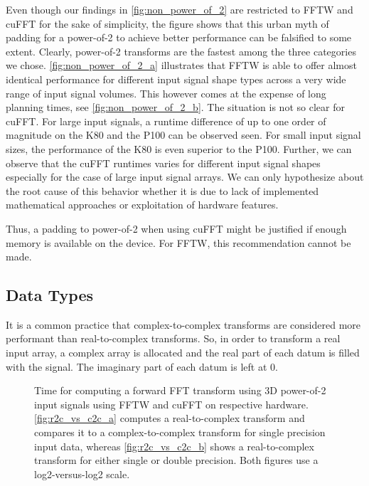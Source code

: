 Even though our findings in \cref{fig:non_power_of_2} are restricted to FFTW and cuFFT for the sake of simplicity, the figure shows that this urban myth of padding for a power-of-2 to achieve better performance can be falsified to some extent. Clearly, power-of-2 transforms are the fastest among the three categories we chose. \cref{fig:non_power_of_2_a} illustrates that FFTW is able to offer almost identical performance for different input signal shape types across a very wide range of input signal volumes. This however comes at the expense of long planning times, see \cref{fig:non_power_of_2_b}. The situation is not so clear for cuFFT. For large input signals, a runtime difference of up to one order of magnitude on the K80 and the P100 can be observed seen. For small input signal sizes, the performance of the K80 is even superior to the P100. Further, we can observe that the cuFFT runtimes varies for different input signal shapes especially for the case of large input signal arrays. We can only hypothesize about the root cause of this behavior whether it is due to lack of implemented mathematical approaches or exploitation of hardware features. 

Thus, a padding to power-of-2 when using cuFFT might be justified if enough memory is available on the device. For FFTW, this recommendation cannot be made.    

\subsection{Data Types}
\label{ssec:data_types}

It is a common practice that complex-to-complex transforms are considered more performant than real-to-complex transforms. So, in order to transform a real input array, a complex array is allocated and the real part of each datum is filled with the signal. The imaginary part of each datum is left at $0$.

\begin{figure}[!tbp]
  \centering
  \hfill
  \caption{Time for computing a forward FFT transform using 3D power-of-2 input signals using FFTW and cuFFT on respective hardware. \cref{fig:r2c_vs_c2c_a} computes a real-to-complex transform and compares it to a complex-to-complex transform for single precision input data, whereas \cref{fig:r2c_vs_c2c_b} shows a real-to-complex transform for either single or double precision. Both figures use a log2-versus-log2 scale.}
  \label{fig:r2c_vs_c2c}
\end{figure}

